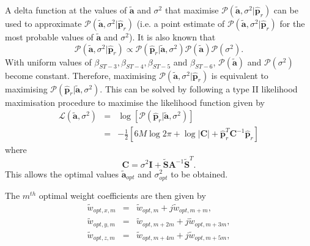 \documentclass[10pt,final]{IEEEtran}
\begin{document}
A delta function at the values of $\tilde{\textbf{a}}$ and $\sigma^{2}$ that maximise $\mathcal{P}(\tilde{\textbf{a}},\sigma^{2}|\hat{\textbf{p}}_{r})$ can be used to approximate $\mathcal{P}(\tilde{\textbf{a}},\sigma^{2}|\hat{\textbf{p}}_{r})$ (i.e. a point estimate of $\mathcal{P}(\tilde{\textbf{a}},\sigma^{2}|\hat{\textbf{p}}_{r})$ for the most probable values of $\tilde{\textbf{a}}$ and $\sigma^{2}$).  It is also known that
\begin{equation}\label{eq:bcs14}
  \mathcal{P}(\tilde{\textbf{a}},\sigma^{2}|\hat{\textbf{p}}_{r})\propto\mathcal{P}(\hat{\textbf{p}}_{r}|\tilde{\textbf{a}},\sigma^{2})\mathcal{P}(\tilde{\textbf{a}})\mathcal{P}(\sigma^{2}).
\end{equation}
With uniform values of $\beta_{ST-3}, \beta_{ST-4}, \beta_{ST-5}$ and $\beta_{ST-6}$, $\mathcal{P}(\tilde{\textbf{a}})$ and $\mathcal{P}(\sigma^{2})$ become constant.  Therefore, maximising $\mathcal{P}(\tilde{\textbf{a}},\sigma^{2}|\hat{\textbf{p}}_{r})$ is equivalent to maximising $\mathcal{P}(\hat{\textbf{p}}_{r}|\tilde{\textbf{a}},\sigma^{2})$.  This can be solved by following a type II likelihood maximisation procedure to maximise the likelihood function given by
\begin{eqnarray}\label{eq:bcs15}\nonumber
  \mathcal{L}(\tilde{\textbf{a}},\sigma^{2})&=&\log[\mathcal{P}(\hat{\textbf{p}}_{r}|\tilde{\textbf{a}},\sigma^{2})]\\
&=&-\frac{1}{2}[6M\log2\pi+\log|\textbf{C}|+\hat{\textbf{p}}_{r}^{T}\textbf{C}^{-1}\hat{\textbf{p}}_{r}]
\end{eqnarray}
where
\begin{equation}\label{eq:bcs15a}
  \textbf{C}=\sigma^{2}\textbf{I}+\tilde{\textbf{S}}\textbf{A}^{-1}\tilde{\textbf{S}}^{T}.
\end{equation}
This allows the optimal values $\tilde{\textbf{a}}_{opt}$ and $\sigma^{2}_{opt}$ to be obtained.

The $m^{th}$ optimal weight coefficients are then given by
\begin{eqnarray}\label{eq:bcs16}
  \tilde{w}_{opt,x,m} &=& \tilde{w}_{opt,m} + j\tilde{w}_{opt,m+m}, \\ \label{eq:bcs17}
  \tilde{w}_{opt,y,m} &=& \tilde{w}_{opt,m+2m} + j\tilde{w}_{opt,m+3m}, \\ \label{eq:bcs18}
  \tilde{w}_{opt,z,m} &=& \tilde{w}_{opt,m+4m} + j\tilde{w}_{opt,m+5m},
\end{eqnarray}
\end{document}
